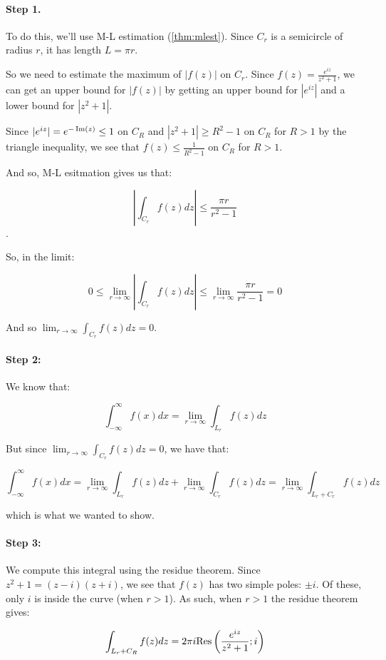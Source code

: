 \begin{ex}{}{}
\paragraph{Step 1.} To do this, we'll use M-L estimation (\ref{thm:mlest}). Since $C_r$ is a semicircle of radius $r$, it has length $L = \pi r$.

So we need to estimate the maximum of $|f(z)|$ on $C_r$. Since $f(z) = \frac{e^{iz}}{z^2 + 1}$, we can get an upper bound for $|f(z)|$ by getting an upper bound for $|e^{iz}|$ and a lower bound for $|z^2 +1|$.

Since $|e^{iz}| = e^{-\operatorname{Im}(z)} \le 1$ on $C_R$ and $|z^2+1| \ge R^2 - 1$ on $C_R$ for $R > 1$ by the triangle inequality, we see that $f(z) \le \frac{1}{R^2-1}$ on $C_R$ for $R>1$.

And so, M-L esitmation gives us that:

$$\left| \int_{C_r} f(z)dz \right| \le \frac{\pi r}{r^2 - 1}$$.

So, in the limit:

$$0 \le \lim_{r\rightarrow \infty} \left| \int_{C_r} f(z)dz \right| \le \lim_{r\rightarrow \infty}\frac{\pi r}{r^2  -1} = 0$$

And so $\lim_{r\rightarrow \infty} \int_{C_r} f(z)dz = 0$.

\paragraph{Step 2:} We know that:

$$\int_{-\infty}^\infty f(x)dx = \lim_{r\rightarrow \infty} \int_{L_r}f(z)dz$$

But since $ \lim_{r\rightarrow \infty} \int_{C_r}f(z)dz = 0$, we have that:

$$\int_{-\infty}^\infty f(x)dx = \lim_{r\rightarrow \infty} \int_{L_r}f(z)dz + \lim_{r\rightarrow \infty} \int_{C_r}f(z)dz =\lim_{r\rightarrow \infty} \int_{L_r+C_r}f(z)dz$$

\noin which is what we wanted to show.

\paragraph{Step 3:} We compute this integral using the residue theorem. Since $z^2+1 = (z-i)(z+i)$, we see that $f(z)$ has two simple poles: $\pm i$. Of these, only $i$ is inside the curve (when $r > 1$). As such, when $r > 1$ the residue theorem gives:

$$\int_{L_r + C_R} f(z)dz = 2\pi i \mathrm{Res}\left(\frac{e^{iz}}{z^2 +1}; i\right)$$


\end{ex}
